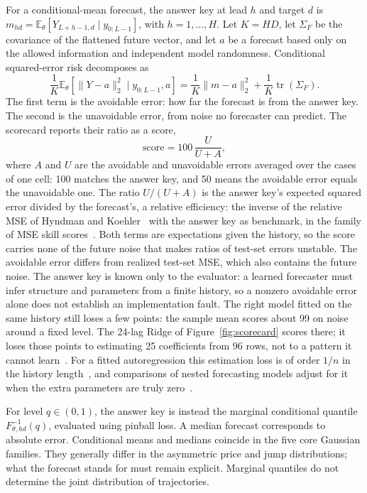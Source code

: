 \documentclass[11pt,a4paper]{article}
\newcommand{\E}{\mathbb{E}}
\begin{document}
For a conditional-mean forecast, the answer key at lead $h$ and target $d$ is
$m_{hd}=\E_\theta[Y_{L+h-1,d}\mid y_{0:L-1}]$, with $h=1,\ldots,H$.
Let $K=HD$, let $\Sigma_F$ be the covariance of the flattened future vector,
and let $a$ be a forecast based only on the allowed information and
independent model randomness. Conditional squared-error risk decomposes as
\begin{equation}
 \frac{1}{K}\E_\theta[\|Y-a\|_2^2\mid y_{0:L-1},a]
 = \frac{1}{K}\|m-a\|_2^2 + \frac{1}{K}\operatorname{tr}(\Sigma_F).
 \label{eq:risk}
\end{equation}
The first term is the avoidable error: how far the forecast is from the
answer key. The second is the unavoidable error, from noise no forecaster
can predict. The scorecard reports their ratio as a score,
\begin{equation}
 \mathrm{score}=100\,\frac{U}{U+A},
 \label{eq:score}
\end{equation}
where $A$ and $U$ are the avoidable and unavoidable errors averaged over
the cases of one cell: 100 matches the answer key, and 50 means the
avoidable error equals the unavoidable one. The ratio $U/(U+A)$ is the
answer key's expected squared error divided by the forecast's, a relative
efficiency: the inverse of the relative MSE of Hyndman and
Koehler~\cite{hyndman2006another} with the answer key as benchmark, in the
family of MSE skill scores~\cite{murphy1988skill}. Both terms are
expectations given the history, so the score carries none of the future
noise that makes ratios of test-set errors unstable. The avoidable error differs
from realized test-set MSE, which also contains the future noise. The
answer key is known only to the evaluator: a learned forecaster must infer
structure and parameters from a finite history, so a nonzero avoidable
error alone does not establish an implementation fault. The right model
fitted on the same history still loses a few points: the sample mean
scores about 99 on noise around a fixed level. The 24-lag Ridge of
Figure~\ref{fig:scorecard} scores \ScorecardNoiseScore{} there; it loses
those points to estimating 25 coefficients from 96 rows, not to a pattern
it cannot learn~\cite{clements1998forecasting}. For a fitted autoregression
this estimation loss is of order $1/n$ in the history
length~\cite{fuller1981properties}, and comparisons of nested forecasting
models adjust for it when the extra parameters are truly
zero~\cite{clark2007approximately}.

For level $q\in(0,1)$, the answer key is instead the marginal conditional
quantile $F_{\theta,hd}^{-1}(q)$, evaluated using pinball loss. A median
forecast corresponds to absolute error. Conditional means and medians
coincide in the five core Gaussian families. They generally differ in the
asymmetric price and jump distributions; what the forecast stands for must
remain explicit.
Marginal quantiles do not determine the joint distribution of trajectories.
\end{document}
